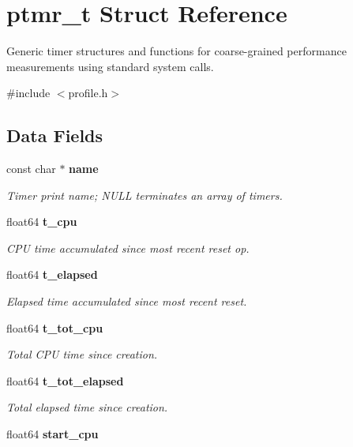 \section{ptmr\+\_\+t Struct Reference}
\label{structptmr__t}


Generic timer structures and functions for coarse-\/grained performance measurements using standard system calls.  




{\ttfamily \#include $<$profile.\+h$>$}

\subsection*{Data Fields}
\begin{DoxyCompactItemize}
\item 
const char $\ast$ {\bf name}
\begin{DoxyCompactList}\small\item\em Timer print name; N\+U\+L\+L terminates an array of timers. \end{DoxyCompactList}\item 
float64 {\bf t\+\_\+cpu}\label{structptmr__t_acbd784f7332329999925d396deae3a5d}

\begin{DoxyCompactList}\small\item\em C\+P\+U time accumulated since most recent reset op. \end{DoxyCompactList}\item 
float64 {\bf t\+\_\+elapsed}\label{structptmr__t_a743fce329d82fd7a9130cba5bbccd991}

\begin{DoxyCompactList}\small\item\em Elapsed time accumulated since most recent reset. \end{DoxyCompactList}\item 
float64 {\bf t\+\_\+tot\+\_\+cpu}\label{structptmr__t_a301d13acc21718143b8b39b7af8b6677}

\begin{DoxyCompactList}\small\item\em Total C\+P\+U time since creation. \end{DoxyCompactList}\item 
float64 {\bf t\+\_\+tot\+\_\+elapsed}\label{structptmr__t_a2dc87aa035c8eb542279ca4496dd76f1}

\begin{DoxyCompactList}\small\item\em Total elapsed time since creation. \end{DoxyCompactList}\item 
float64 {\bf start\+\_\+cpu}\label{structptmr__t_a85c0c5f0e321cf11fb478b92a05223e8}


\end{DoxyCompactItemize}

